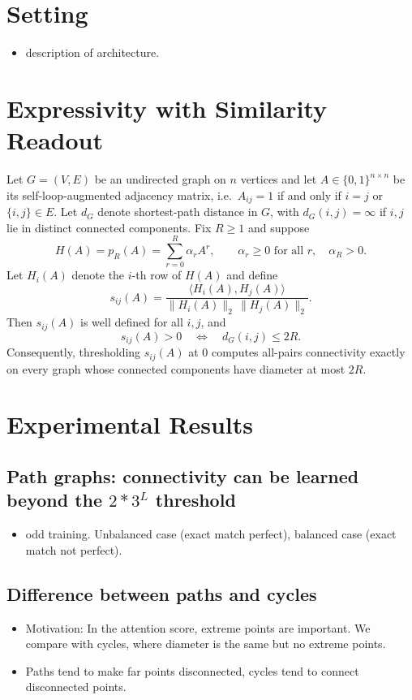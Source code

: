 \documentclass{article}
\begin{document}
\section{Setting}
\begin{itemize}
    \item description of architecture.
\end{itemize}


\section{Expressivity with Similarity Readout}

\begin{theorem}
\label{thm:similarity_readout_doubles_radius}
Let $G=(V,E)$ be an undirected graph on $n$ vertices and let
$A\in\{0,1\}^{n\times n}$ be its self-loop-augmented adjacency matrix,
i.e.\ $A_{ij}=1$ if and only if $i=j$ or $\{i,j\}\in E$. Let $d_G$ denote
shortest-path distance in $G$, with $d_G(i,j)=\infty$ if $i,j$ lie in
distinct connected components. Fix $R\geq 1$ and suppose
\[
H(A)=p_R(A)=\sum_{r=0}^{R}\alpha_r A^r,
\qquad \alpha_r\geq 0 \text{ for all } r,\quad \alpha_R>0 .
\]
Let $H_i(A)$ denote the $i$-th row of $H(A)$ and define
\[
s_{ij}(A)=\frac{\langle H_i(A),H_j(A)\rangle}
{\|H_i(A)\|_2\,\|H_j(A)\|_2}.
\]
Then $s_{ij}(A)$ is well defined for all $i,j$, and
\[
s_{ij}(A)>0 \quad\Longleftrightarrow\quad d_G(i,j)\leq 2R .
\]
Consequently, thresholding $s_{ij}(A)$ at $0$ computes all-pairs
connectivity exactly on every graph whose connected components have
diameter at most $2R$.
\end{theorem}


\section{Experimental Results}

\subsection{Path graphs: connectivity can be learned beyond the $2*3^L$ threshold}

\begin{itemize}
    \item odd training. Unbalanced case (exact match perfect), balanced case (exact match not perfect). 
\end{itemize}


\subsection{Difference between paths and cycles}
\begin{itemize}
    \item Motivation: In the attention score, extreme points are important. We compare with cycles, where diameter is the same but no extreme points. 
    \item Paths tend to make far points disconnected, cycles tend to connect disconnected points. 
\end{itemize}
\end{document}
